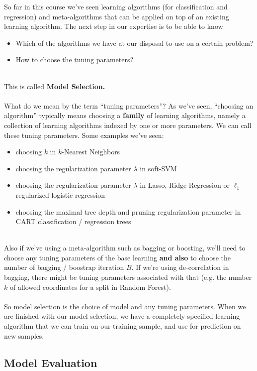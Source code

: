 \documentclass[11pt]{article}
\begin{document}
So far in this course we've seen learning algorithms (for classification and
regression) and meta-algorithms that can be applied on top of an existing
learning algorithm. The next step in our expertise is to be able to know 
\begin{itemize}
  \item Which of the algorithms we have at our disposal to use on a certain
    problem?
  \item How to choose the tuning parameters?
\end{itemize}
~\\
This is called {\bf Model Selection.} 
\\~\\
What do we mean by the term ``tuning parameters''?
As we've seen, ``choosing an algorithm'' typically means choosing a {\bf family} of
learning algorithms, namely a collection of learning algorithms indexed by one
or more parameters. We can call these tuning parameters. 
Some examples we've seen:
\begin{itemize}
  \item choosing $k$ in $k$-Nearest Neighbors
  \item choosing the regularization parameter $\lambda$ in soft-SVM
  \item choosing the regularization parameter $\lambda$ in Lasso, Ridge Regression or
    $\ell_1$-regularized logistic regression
  \item choosing the maximal tree depth and pruning regularization parameter in
    CART classification / regression trees
\end{itemize}
~\\
Also if we've using a meta-algorithm such as bagging or boosting, we'll need to
choose any tuning parameters of the base learning {\bf and also} to choose the number
of bagging / boostrap iteration $B$. If we're using de-correlation in bagging,
there might be tuning parameters associated with that (e.g. the number $k$ of
allowed coordinates for a split in Random Forest).
\\~\\
So model selection is the choice of model and any tuning parameters. When 
we are
finished with our model selection, we have a completely specified learning algorithm
that we can train on our training sample, and use for prediction on new samples.

\subsection{Model Evaluation}
\end{document}
